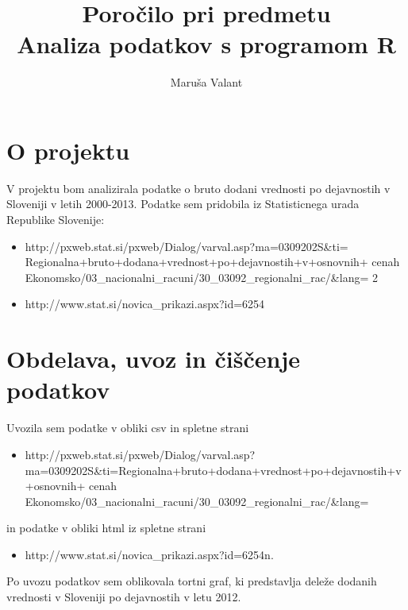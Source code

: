 \documentclass[11pt,a4paper]{article}
\begin{document}
\title{Poročilo pri predmetu \\
Analiza podatkov s programom R}
\author{Maruša Valant}

\section{O projektu}

V projektu bom analizirala podatke o bruto dodani vrednosti po dejavnostih
v Sloveniji v letih 2000-2013. Podatke sem pridobila iz Statisticnega urada
Republike Slovenije:
\begin{itemize}
\item{http://pxweb.stat.si/pxweb/Dialog/varval.asp?ma=0309202S&ti=
Regionalna+bruto+dodana+vrednost+po+dejavnostih+v+osnovnih+
cenah%
Ekonomsko/03_nacionalni_racuni/30_03092_regionalni_rac/&lang=
2}
\item{http://www.stat.si/novica_prikazi.aspx?id=6254}
\end{itemize}
\section{Obdelava, uvoz in čiščenje podatkov}
Uvozila sem podatke v obliki csv in spletne strani
\begin{itemize}
\item{http://pxweb.stat.si/pxweb/Dialog/varval.asp?ma=0309202S&ti=Regionalna+bruto+dodana+vrednost+po+dejavnostih+v+osnovnih+
cenah%
Ekonomsko/03_nacionalni_racuni/30_03092_regionalni_rac/&lang=}
\end{itemize}
in podatke v obliki html iz spletne strani
\begin{itemize}
\item{http://www.stat.si/novica_prikazi.aspx?id=6254n}.
\end{itemize}

Po uvozu podatkov sem oblikovala tortni graf, ki predstavlja deleže dodanih
vrednosti v Sloveniji po dejavnostih v letu 2012.
\end{document}
